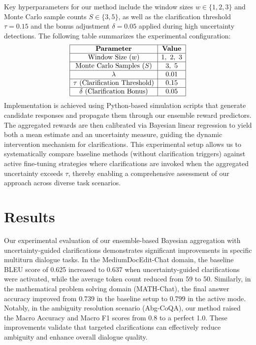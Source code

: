 \documentclass{article}
\begin{document}
Key hyperparameters for our method include the window sizes \(w \in \{1,2,3\}\) and Monte Carlo sample counts \(S \in \{3,5\}\), as well as the clarification threshold \(\tau = 0.15\) and the bonus adjustment \(\delta = 0.05\) applied during high uncertainty detections. The following table summarizes the experimental configuration:
\[
\begin{array}{|c|c|}
\hline
\textbf{Parameter} & \textbf{Value} \\
\hline
\text{Window Size } (w) & 1,\ 2,\ 3 \\
\hline
\text{Monte Carlo Samples } (S) & 3,\ 5 \\
\hline
\lambda & 0.01 \\
\hline
\tau\ (\text{Clarification Threshold}) & 0.15 \\
\hline
\delta\ (\text{Clarification Bonus}) & 0.05 \\
\hline
\end{array}
\]
Implementation is achieved using Python-based simulation scripts that generate candidate responses and propagate them through our ensemble reward predictors. The aggregated rewards are then calibrated via Bayesian linear regression to yield both a mean estimate and an uncertainty measure, guiding the dynamic intervention mechanism for clarifications. This experimental setup allows us to systematically compare baseline methods (without clarification triggers) against active fine-tuning strategies where clarifications are invoked when the aggregated uncertainty exceeds \(\tau\), thereby enabling a comprehensive assessment of our approach across diverse task scenarios.

\section{Results}
Our experimental evaluation of our ensemble-based Bayesian aggregation with uncertainty-guided clarifications demonstrates significant improvements in specific multiturn dialogue tasks. In the MediumDocEdit-Chat domain, the baseline BLEU score of 0.625 increased to 0.637 when uncertainty-guided clarifications were activated, while the average token count reduced from 59 to 50. Similarly, in the mathematical problem solving domain (MATH-Chat), the final answer accuracy improved from 0.739 in the baseline setup to 0.799 in the active mode. Notably, in the ambiguity resolution scenario (Abg-CoQA), our method raised the Macro Accuracy and Macro F1 scores from 0.8 to a perfect 1.0. These improvements validate that targeted clarifications can effectively reduce ambiguity and enhance overall dialogue quality.
\end{document}
